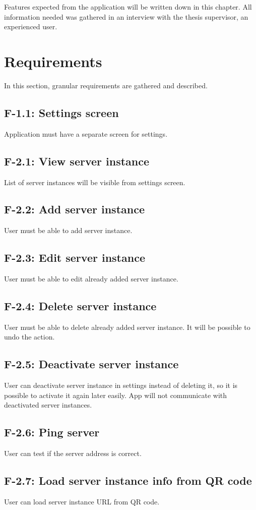 Features expected from the application will be written down in this chapter.
All information needed was gathered in an interview with the thesis supervisor, an experienced \etl{} user.
\section{Requirements}
In this section, granular requirements are gathered and described.

\subsection*{F-1.1: Settings screen}
Application must have a separate screen for settings.
\subsection*{F-2.1: View server instance}
List of server instances will be visible from settings screen.
\subsection*{F-2.2: Add server instance}
User must be able to add server instance.
\subsection*{F-2.3: Edit server instance}
User must be able to edit already added server instance.
\subsection*{F-2.4: Delete server instance}
User must be able to delete already added server instance. It will be possible to undo the action.
\subsection*{F-2.5: Deactivate server instance}
User can deactivate server instance in settings instead of deleting it, so it is possible to activate it again later easily. App will not communicate with deactivated server instances.
\subsection*{F-2.6: Ping server}
\label{subsec:ping}
User can test if the server address is correct.
\subsection*{F-2.7: Load server instance info from QR code}
\label{subsec:qrcode}
User can load server instance URL from QR code.
